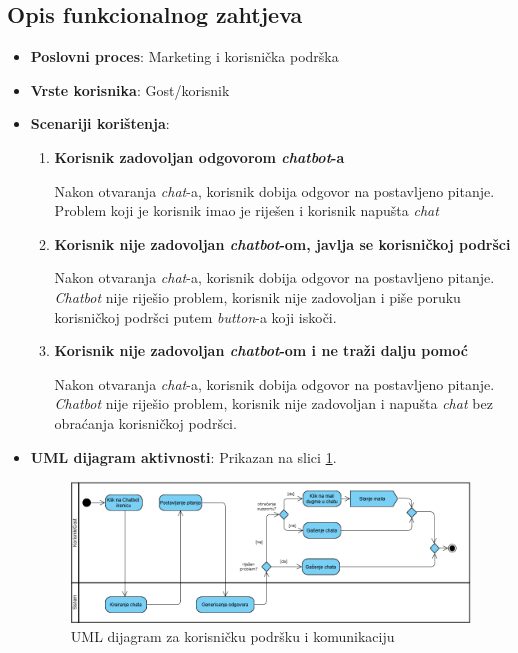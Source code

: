 \subsection{Opis funkcionalnog zahtjeva}  
\begin{itemize}  
    \item \textbf{Poslovni proces}: Marketing i korisnička podrška
    \item \textbf{Vrste korisnika}: Gost/korisnik 
    \item \textbf{Scenariji korištenja}:  
    \begin{enumerate}  
        \item \textbf{Korisnik zadovoljan odgovorom \textit{chatbot}-a}

        Nakon otvaranja \textit{chat}-a, korisnik dobija odgovor na postavljeno pitanje. Problem koji je korisnik imao je riješen i korisnik napušta \textit{chat}
        
        \item \textbf{Korisnik nije zadovoljan \textit{chatbot}-om, javlja se korisničkoj podršci}

        Nakon otvaranja \textit{chat}-a, korisnik dobija odgovor na postavljeno pitanje. \textit{Chatbot} nije riješio problem, korisnik nije zadovoljan i piše poruku korisničkoj podršci putem \textit{button}-a koji iskoči.
        
        \item \textbf{Korisnik nije zadovoljan \textit{chatbot}-om i ne traži dalju pomoć}

        Nakon otvaranja \textit{chat}-a, korisnik dobija odgovor na postavljeno pitanje. \textit{Chatbot} nije riješio problem, korisnik nije zadovoljan i napušta \textit{chat} bez obraćanja korisničkoj podršci.
    \end{enumerate}  

    \item \textbf{UML dijagram aktivnosti}: Prikazan na slici \ref{fig:fz6UML}. 
    
    \vspace{0.5cm}
    
    \begin{figure}[H]
        \centering
        \includegraphics[width=1\linewidth]{Slike/FZ6/uml.png}
        \caption{UML dijagram za korisničku podršku i komunikaciju}
        \label{fig:fz6UML}
    \end{figure}
    

\end{itemize}
